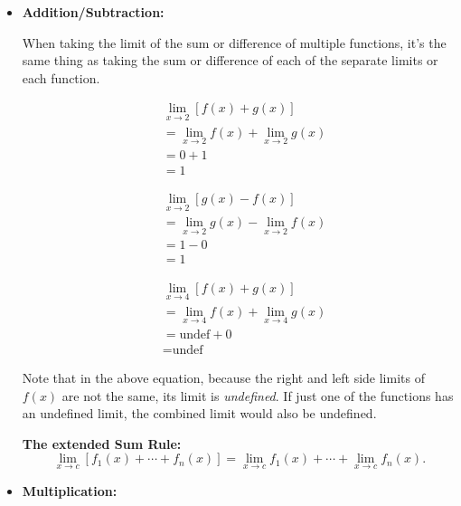 \documentclass[12pt]{article}
\begin{document}
\begin{itemize}
    \item \textbf{Addition/Subtraction:}

          When taking the limit of the sum or difference of multiple functions, it's the same thing as taking the sum or difference of each of the separate limits or each function.

          \begin{align*}
               & \lim_{x \to 2} \left[ f(x) + g(x) \right]   \\
               & = \lim_{x \to 2} f(x) + \lim_{x \to 2} g(x) \\
               & = 0 + 1                                     \\
               & = 1
          \end{align*}

          \begin{align*}
               & \lim_{x \to 2} \left[ g(x) - f(x) \right]   \\
               & = \lim_{x \to 2} g(x) - \lim_{x \to 2} f(x) \\
               & = 1 - 0                                     \\
               & = 1
          \end{align*}

          \begin{align*}
               & \lim_{x \to 4} \left[ f(x) + g(x) \right]   \\
               & = \lim_{x \to 4} f(x) + \lim_{x \to 4} g(x) \\
               & = \text{undef} + 0                          \\
               & = \text{undef}
          \end{align*}

          \indent Note that in the above equation, because the right and left side limits of $f(x)$ are not the same, its limit is \textit{undefined}. If just one of the functions has an undefined limit, the combined limit would also be undefined.

          \noindent\textbf{The extended Sum Rule:}
          \begin{equation*}
              \lim_{x \to c} \left[ f_1(x) + \cdots + f_n(x) \right]
              = \lim_{x \to c} f_1(x) + \cdots + \lim_{x \to c} f_n(x).
          \end{equation*}
          \smallskip

    \item \textbf{Multiplication:}


\end{itemize}
\end{document}
